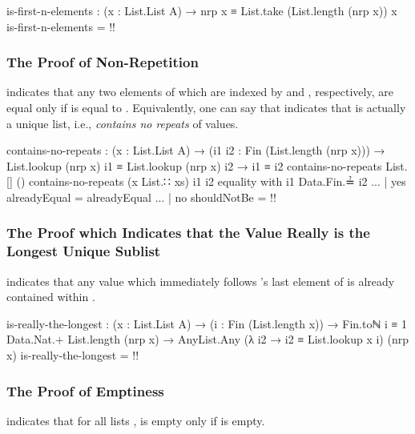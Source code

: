 \documentclass{report}
\begin{document}
\begin{code}
  is-first-n-elements :
    (x : List.List A) →
    nrp x ≡ List.take (List.length (nrp x)) x
  is-first-n-elements = {!!}
\end{code}

\subsubsection{The Proof of Non-Repetition}
  indicates that any two elements of   which are indexed by  and , respectively, are equal only if  is equal to .  Equivalently, one can say that   indicates that   is actually a unique list, i.e., \emph{contains no repeats} of values.

\begin{code}
  contains-no-repeats :
    (x : List.List A) →
    (i1 i2 : Fin (List.length (nrp x))) →
    List.lookup (nrp x) i1 ≡ List.lookup (nrp x) i2 →
    i1 ≡ i2
  contains-no-repeats List.[] ()
  contains-no-repeats (x List.∷ xs) i1 i2 equality with i1 Data.Fin.≟ i2
  ... | yes alreadyEqual = alreadyEqual
  ... | no shouldNotBe = {!!}
\end{code}

\subsubsection{The Proof which Indicates that the Value Really is the Longest Unique Sublist}
  indicates that any value which immediately follows  's last element of  is already contained within  .

\begin{code}
  is-really-the-longest :
    (x : List.List A) →
    (i : Fin (List.length x)) →
    Fin.toℕ i ≡ 1 Data.Nat.+ List.length (nrp x) →
    AnyList.Any (λ i2 → i2 ≡ List.lookup x i) (nrp x)
  is-really-the-longest = {!!}
\end{code}

\subsubsection{The Proof of Emptiness}
 indicates that for all lists ,   is empty only if  is empty.
\end{document}
